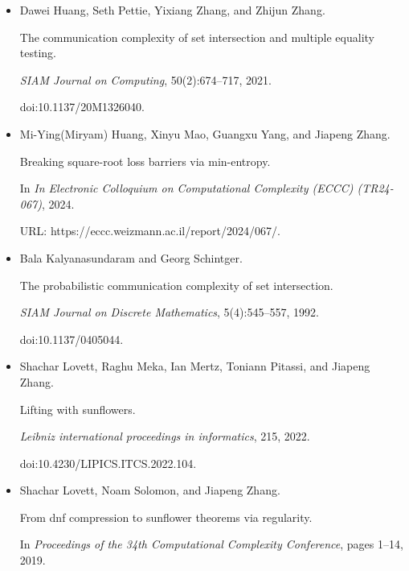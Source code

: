 \documentclass[10pt,a4paper]{article}
\begin{document}
\begin{itemize}
\item[] 
[32]

Dawei Huang, Seth Pettie, Yixiang Zhang, and Zhijun Zhang.


The communication complexity of set intersection and multiple
equality testing.


\emph{SIAM Journal on Computing}, 50(2):674–717, 2021.


doi:10.1137/20M1326040.





\item[] 
[33]

Mi-Ying(Miryam) Huang, Xinyu Mao, Guangxu Yang, and Jiapeng Zhang.


Breaking square-root loss barriers via min-entropy.


In \emph{In Electronic Colloquium on Computational Complexity (ECCC)
(TR24-067)}, 2024.


URL: https://eccc.weizmann.ac.il/report/2024/067/.





\item[] 
[34]

Bala Kalyanasundaram and Georg Schintger.


The probabilistic communication complexity of set intersection.


\emph{SIAM Journal on Discrete Mathematics}, 5(4):545–557, 1992.


doi:10.1137/0405044.





\item[] 
[35]

Shachar Lovett, Raghu Meka, Ian Mertz, Toniann Pitassi, and Jiapeng Zhang.


Lifting with sunflowers.


\emph{Leibniz international proceedings in informatics}, 215, 2022.


doi:10.4230/LIPICS.ITCS.2022.104.





\item[] 
[36]

Shachar Lovett, Noam Solomon, and Jiapeng Zhang.


From dnf compression to sunflower theorems via regularity.


In \emph{Proceedings of the 34th Computational Complexity Conference},
pages 1–14, 2019.



\end{itemize}
\end{document}
